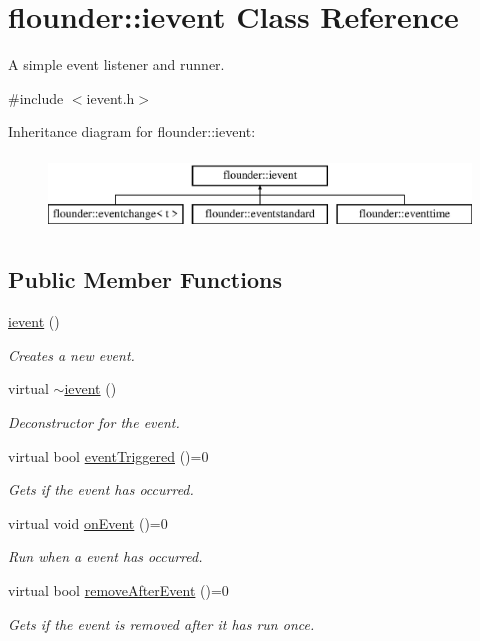 \hypertarget{classflounder_1_1ievent}{}\section{flounder\+:\+:ievent Class Reference}
\label{classflounder_1_1ievent}


A simple event listener and runner.  




{\ttfamily \#include $<$ievent.\+h$>$}

Inheritance diagram for flounder\+:\+:ievent\+:\begin{figure}[H]
\begin{center}
\leavevmode
\includegraphics[height=2.000000cm]{classflounder_1_1ievent}
\end{center}
\end{figure}
\subsection*{Public Member Functions}
\begin{DoxyCompactItemize}
\item 
\hyperlink{classflounder_1_1ievent_a87c44726337bd80b2b18a01ccdd562c6}{ievent} ()
\begin{DoxyCompactList}\small\item\em Creates a new event. \end{DoxyCompactList}\item 
virtual \hyperlink{classflounder_1_1ievent_af559376463c0e0643c67f8812169007c}{$\sim$ievent} ()
\begin{DoxyCompactList}\small\item\em Deconstructor for the event. \end{DoxyCompactList}\item 
virtual bool \hyperlink{classflounder_1_1ievent_a4462f66feef99ef4e3521c00f4edd0c9}{event\+Triggered} ()=0
\begin{DoxyCompactList}\small\item\em Gets if the event has occurred. \end{DoxyCompactList}\item 
virtual void \hyperlink{classflounder_1_1ievent_a6c6abe67435870b25eccd57a251a8992}{on\+Event} ()=0
\begin{DoxyCompactList}\small\item\em Run when a event has occurred. \end{DoxyCompactList}\item 
virtual bool \hyperlink{classflounder_1_1ievent_a7017c8803df2397758980cb61020e801}{remove\+After\+Event} ()=0
\begin{DoxyCompactList}\small\item\em Gets if the event is removed after it has run once. \end{DoxyCompactList}\end{DoxyCompactItemize}


